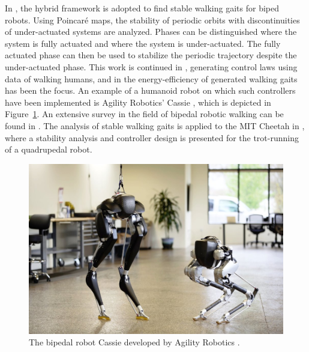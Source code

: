 \documentclass[../DC2019003Bouma.tex]{subfiles}
\begin{document}
In \cite{Grizzle2001,Morris2009}, the hybrid framework is adopted to find stable walking gaits for biped robots. Using Poincar\'{e} maps, the stability of periodic orbits with discontinuities of under-actuated systems are analyzed. Phases can be distinguished where the system is fully actuated and where the system is under-actuated. The fully actuated phase can then be used to stabilize the periodic trajectory despite the under-actuated phase. This work is continued in \cite{Ames2014}, generating control laws using data of walking humans, and in \cite{Reher2016} the energy-efficiency of generated walking gaits has been the focus. An example of a humanoid robot on which such controllers have been implemented is Agility Robotics' Cassie \cite{Cassie}, which is depicted in Figure~\ref{fig:cassie}. An extensive survey in the field of bipedal robotic walking can be found in \cite{Grizzle2014}. The analysis of stable walking gaits is applied to the MIT Cheetah in \cite{Hyun2014}, where a stability analysis and controller design is presented for the trot-running of a quadrupedal robot.  

\begin{figure}[b!]
\centering
\includegraphics[width=.6\textwidth]{cassie.jpg}\caption{The bipedal robot Cassie developed by Agility Robotics \cite{Cassie}.}\label{fig:cassie}
\end{figure}
\end{document}
